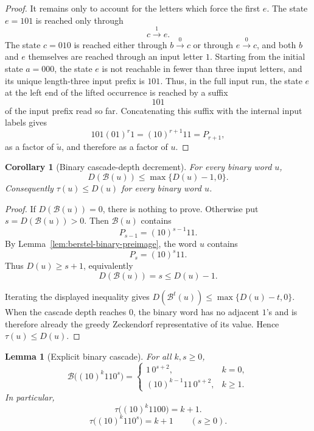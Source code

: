 \documentclass[11pt,letterpaper]{article}
\numberwithin{equation}{section}
\theoremstyle{plain}
\newtheorem{lemma}[theorem]{Lemma}
\newtheorem{corollary}[theorem]{Corollary}
\theoremstyle{definition}
\theoremstyle{remark}
\newcommand{\Berstel}{\mathcal{B}}
\begin{document}
\begin{proof}
It remains only to account for the letters which force the first $e$.  The
state $e=101$ is reached only through
\[
c\xrightarrow{1}e.
\]
The state $c=010$ is reached either through $b\xrightarrow{0}c$ or through
$e\xrightarrow{0}c$, and both $b$ and $e$ themselves are reached through an
input letter $1$.  Starting from the initial state $a=000$, the state $e$ is
not reachable in fewer than three input letters, and its unique length-three
input prefix is $101$.  Thus, in the full input run, the state $e$ at the left
end of the lifted occurrence is reached by a suffix
\[
101
\]
of the input prefix read so far.  Concatenating this suffix with the internal
input labels gives
\[
101(01)^r1=(10)^{r+1}11=P_{r+1},
\]
as a factor of $\widetilde u$, and therefore as a factor of $u$.
\end{proof}

\begin{corollary}[Binary cascade-depth decrement]\label{lem:berstel-cascade-decrement}
For every binary word $u$,
\[
D(\Berstel(u))\le \max\{D(u)-1,0\}.
\]
Consequently $\tau(u)\le D(u)$ for every binary word $u$.
\end{corollary}

\begin{proof}
If $D(\Berstel(u))=0$, there is nothing to prove.  Otherwise put
$s=D(\Berstel(u))>0$.  Then $\Berstel(u)$ contains
\[
P_{s-1}=(10)^{s-1}11.
\]
By Lemma~\ref{lem:berstel-binary-preimage}, the word $u$ contains
\[
P_s=(10)^s11.
\]
Thus $D(u)\ge s+1$, equivalently
\[
D(\Berstel(u))=s\le D(u)-1.
\]

Iterating the displayed inequality gives
$D(\Berstel^t(u))\le \max\{D(u)-t,0\}$.  When the cascade depth reaches $0$,
the binary word has no adjacent $1$'s and is therefore already the greedy
Zeckendorf representative of its value.  Hence $\tau(u)\le D(u)$.
\end{proof}

\begin{lemma}[Explicit binary cascade]\label{lem:berstel-binary-cascade}
For all $k,s\ge 0$,
\[
\Berstel\bigl((10)^k110^s\bigr)
=
\begin{cases}
1\,0^{s+2},&k=0,\\[1mm]
(10)^{k-1}11\,0^{s+2},&k\ge 1.
\end{cases}
\]
In particular,
\[
\tau\bigl((10)^k1100\bigr)=k+1.
\]
\[
\tau\bigl((10)^k110^s\bigr)=k+1\qquad(s\ge 0).
\]
\end{lemma}
\end{document}
